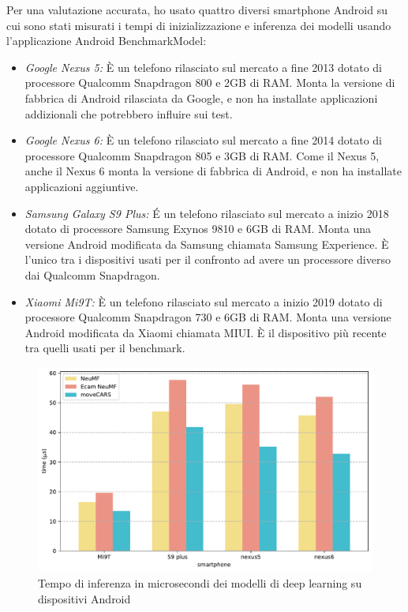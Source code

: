 \documentclass[12pt,italian]{report}
\begin{document}
\noindent Per una valutazione accurata, ho usato quattro diversi smartphone Android su cui sono stati misurati i tempi di inizializzazione e inferenza dei modelli usando l'applicazione Android BenchmarkModel:
\begin{itemize}
\item \textit{Google Nexus 5:} \`E un telefono rilasciato sul mercato a fine 2013 dotato di processore Qualcomm Snapdragon 800 e 2GB di RAM. Monta la versione di fabbrica di Android rilasciata da Google, e non ha installate applicazioni addizionali che potrebbero influire sui test.

\item \textit{Google Nexus 6:} \`E un telefono rilasciato sul mercato a fine 2014 dotato di processore Qualcomm Snapdragon 805 e 3GB di RAM. Come il Nexus 5, anche il Nexus 6 monta la versione di fabbrica di Android, e non ha installate applicazioni aggiuntive.

\item \textit{Samsung Galaxy S9 Plus:} \'E un telefono rilasciato sul mercato a inizio 2018 dotato di processore Samsung Exynos 9810 e 6GB di RAM. Monta una versione Android modificata da Samsung chiamata Samsung Experience. \`E l'unico tra i dispositivi usati per il confronto ad avere un processore diverso dai Qualcomm Snapdragon.

\item \textit{Xiaomi Mi9T:} \`E un telefono rilasciato sul mercato a inizio 2019 dotato di processore Qualcomm Snapdragon 730  e 6GB di RAM. Monta una versione Android modificata da Xiaomi chiamata MIUI. \`E il dispositivo più recente tra quelli usati per il benchmark.
\end{itemize}

\begin{figure}
  \centering
  \includegraphics[width=\linewidth]{immagini/inference_tflite.pdf}
  \caption{Tempo di inferenza in microsecondi dei modelli di deep learning su dispositivi Android}
  \label{fig:inference-time}
\end{figure}
\end{document}
